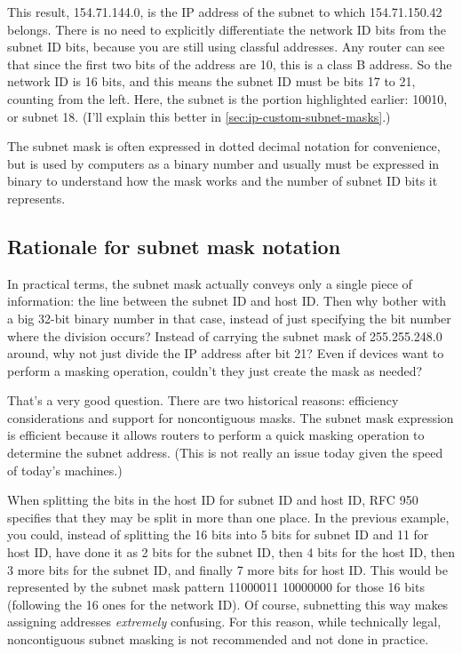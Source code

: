 This result, 154.71.144.0, is the IP address of the subnet to which 154.71.150.42 belongs.
There is no need to explicitly differentiate the network ID bits from the subnet ID bits, because you are still using classful addresses.
Any router can see that since the first two bits of the address are 10, this is a class B address.
So the network ID is 16 bits, and this means the subnet ID must be bits 17 to 21, counting from the left.
Here, the subnet is the portion highlighted earlier: 10010, or subnet 18.
(I'll explain this better in \vref{sec:ip-custom-subnet-masks}.)


\begin{keyconcept}
The subnet mask is often expressed in dotted decimal notation for convenience, but is used by computers as a binary
number and usually must be expressed in binary to understand how the mask works and the number of subnet ID bits it represents.
\end{keyconcept}


\subsection{Rationale for subnet mask notation}

In practical terms, the subnet mask actually conveys only a single piece
of information: the line between the subnet ID and host ID. Then why
bother with a big 32-bit binary number in that case, instead of just
specifying the bit number where the division occurs? Instead of carrying
the subnet mask of 255.255.248.0 around, why not just divide the IP
address after bit 21? Even if devices want to perform a masking
operation, couldn't they just create the mask as needed?

That's a very good question. There are two historical reasons:
efficiency considerations and support for
noncontiguous
masks. The subnet mask expression is efficient because it allows routers
to perform a quick masking operation to determine the subnet address.
(This is not really an issue today given the speed of today's machines.)

When splitting the bits in the host ID for subnet ID and host ID, RFC
950 specifies that they may be split in more than one place. In the
previous example, you could, instead of splitting the 16 bits into 5
bits for subnet ID and 11 for host ID, have done it as 2 bits for the
subnet ID, then 4 bits for the host ID, then 3 more bits for the subnet
ID, and finally 7 more bits for host ID. This would be represented by
the subnet mask pattern 11000011 10000000 for those 16 bits (following
the 16 ones for the network ID). Of course, subnetting this way makes
assigning addresses \emph{extremely} confusing.
For this reason, while technically legal, noncontiguous subnet masking is not recommended and not done in practice.

